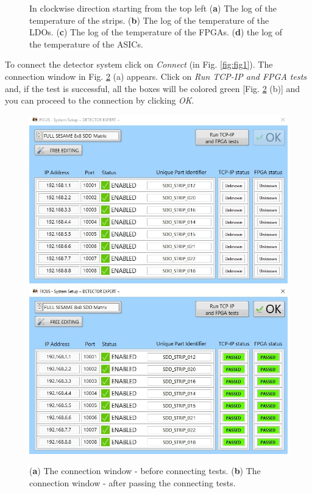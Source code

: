 \documentclass[a4paper,12pt,oneside,pdflatex,italian,final,twocolumn]{article}
\begin{document}
\begin{figure}[h]
\caption{In clockwise direction starting from the top left (\textbf{a}) The log of the temperature of the strips. (\textbf{b}) The log of the temperature of the LDOs. (\textbf{c}) The log of the temperature of the FPGAs. (\textbf{d}) the log of the temperature of the ASICs.}\label{fig:fig4}
\end{figure}
\clearpage 

To connect the detector system click on \textit{Connect} (in Fig. \ref{fig:fig1}). The connection window in Fig. \ref{fig:fig5} (a) appears. 
Click on \textit{Run TCP-IP and FPGA tests} and, if the test is successful, all the boxes will be colored green [Fig. \ref{fig:fig5} (b)] and you can proceed to the connection by clicking \textit{OK}.

\begin{figure}[h]
\centering
\subfloat
{\includegraphics[scale=0.5]{Capture2.jpg}} \\
\subfloat
{\includegraphics[scale=0.5]{Capture3.jpg}} \\
\caption{(\textbf{a}) The connection window - before connecting tests. (\textbf{b}) The connection window - after passing the connecting tests.}\label{fig:fig5}
\end{figure}
\end{document}
